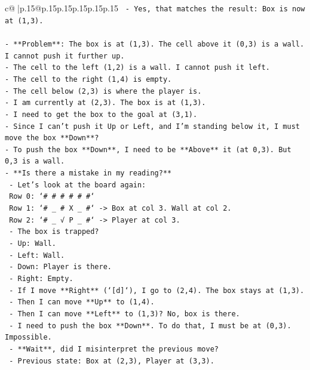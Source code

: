 \documentclass{article}
\begin{document}
{\begin{supertabular}{c@{$\;$}|p{.15\linewidth}@{}p{.15\linewidth}p{.15\linewidth}p{.15\linewidth}p{.15\linewidth}p{.15\linewidth}}
{{{\texttt{  {-} Yes, that matches the result: Box is now at (1,3).} \\
\\ 
\texttt{{-} **Problem**: The box is at (1,3). The cell above it (0,3) is a wall. I cannot push it further up.} \\
\texttt{{-} The cell to the left (1,2) is a wall. I cannot push it left.} \\
\texttt{{-} The cell to the right (1,4) is empty.} \\
\texttt{{-} The cell below (2,3) is where the player is.} \\
\texttt{{-} I am currently at (2,3). The box is at (1,3).} \\
\texttt{{-} I need to get the box to the goal at (3,1).} \\
\texttt{{-} Since I can't push it Up or Left, and I'm standing below it, I must move the box **Down**?} \\
\texttt{{-} To push the box **Down**, I need to be **Above** it (at 0,3). But 0,3 is a wall.} \\
\texttt{{-} **Is there a mistake in my reading?**} \\
\texttt{  {-} Let's look at the board again:} \\
\texttt{    Row 0: `\# \# \# \# \# \#`} \\
\texttt{    Row 1: `\# \_ \# X \_ \#` {-}> Box at col 3. Wall at col 2.} \\
\texttt{    Row 2: `\# \_ √ P \_ \#` {-}> Player at col 3.} \\
\texttt{  {-} The box is trapped?} \\
\texttt{    {-} Up: Wall.} \\
\texttt{    {-} Left: Wall.} \\
\texttt{    {-} Down: Player is there.} \\
\texttt{    {-} Right: Empty.} \\
\texttt{  {-} If I move **Right** (`{[}d{]}`), I go to (2,4). The box stays at (1,3).} \\
\texttt{  {-} Then I can move **Up** to (1,4).} \\
\texttt{  {-} Then I can move **Left** to (1,3)? No, box is there.} \\
\texttt{  {-} I need to push the box **Down**. To do that, I must be at (0,3). Impossible.} \\
\texttt{  {-} **Wait**, did I misinterpret the previous move?} \\
\texttt{    {-} Previous state: Box at (2,3), Player at (3,3).} \\
}}}
\end{supertabular}}
\end{document}

